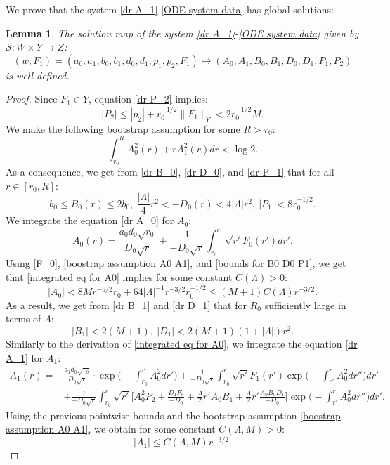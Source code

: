 \documentclass[11pt]{article}
\newtheorem{lemma}{Lemma}[section]
\numberwithin{equation}{section}
\begin{document}
We prove that the system \eqref{dr A_1}-\eqref{ODE system data} has global solutions:
\begin{lemma}\label{S is well defined lemma}
        The solution map of the system \eqref{dr A_1}-\eqref{ODE system data} given by $\mathcal{S}:W\times Y\rightarrow Z$: \[(w,F_1)=(a_0,a_1,b_0,b_1,d_0,d_1,p_1,p_2,F_1)\mapsto(A_0,A_1,B_0,B_1,D_0,D_1,P_1,P_2)\] is well-defined.
\end{lemma}
    \begin{proof}
        Since $F_1\in Y$, equation \eqref{dr P_2} implies:
        \[|P_2|\leq|p_2|+r_0^{-1/2}\|F_1\|_Y<2r_0^{-1/2}M.\]
        We make the following bootstrap assumption for some $R>r_0$:
        \begin{equation}\label{boostrap assumption A0 A1}
            \int_{r_0}^RA_0^2(r)+rA_1^2(r)dr<\log2.
        \end{equation}
        As a consequence, we get from \eqref{dr B_0}, \eqref{dr D_0}, and \eqref{dr P_1} that for all $r\in[r_0,R]$:
        \begin{equation}\label{bounds for B0 D0 P1}
            b_0\leq B_0(r)\leq 2b_0,\ \frac{|\Lambda|}{4}r^2<-D_0(r)<4|\Lambda|r^2,\ |P_1|<8r_0^{-1/2}.
        \end{equation}
        We integrate the equation \eqref{dr A_0} for $A_0:$
        \begin{equation}\label{integrated eq for A0}
            A_0(r)=\frac{a_0d_0\sqrt{r_0}}{D_0\sqrt{r}}+\frac{1}{-D_0\sqrt{r}}\int_{r_0}^r\sqrt{r'}F_0(r')dr'.
        \end{equation}
        Using \eqref{F_0}, \eqref{boostrap assumption A0 A1}, and \eqref{bounds for B0 D0 P1}, we get that \eqref{integrated eq for A0} implies for some constant $C(\Lambda)>0$:
        \begin{equation}\label{pointwise bound for A0}
            |A_0|<8Mr^{-5/2}r_0+64|\Lambda|^{-1}r^{-3/2}r_0^{-1/2}\leq (M+1)C(\Lambda)r^{-3/2}.
        \end{equation}
        As a result, we get from \eqref{dr B_1} and \eqref{dr D_1} that for $R_0$ sufficiently large in terms of $\Lambda$:
        \[|B_1|<2(M+1),\ |D_1|<2(M+1)(1+|\Lambda|)r^2.\]
        Similarly to the derivation of \eqref{integrated eq for A0}, we integrate the equation \eqref{dr A_1} for $A_1:$
        \begin{align*}
            A_1(r)=&\frac{a_1d_0\sqrt{r_0}}{D_0\sqrt{r}}\cdot\exp\bigg(-\int_{r_0}^rA_0^2dr'\bigg)+\frac{1}{-D_0\sqrt{r}}\int_{r_0}^r\sqrt{r'}F_1(r')\exp\bigg(-\int_{r'}^rA_0^2dr''\bigg)dr'\\
            &+\frac{1}{-D_0\sqrt{r}}\int_{r_0}^r\sqrt{r'}\bigg[A_0^2P_2+\frac{D_1F_0}{-D_0}+\frac{\Lambda}{2}r'A_0B_1+\frac{\Lambda}{2}r'\frac{A_0B_0D_1}{-D_0}\bigg]\exp\bigg(-\int_{r'}^rA_0^2dr''\bigg)dr'.
        \end{align*}
        Using the previous pointwise bounds and the bootstrap assumption \eqref{boostrap assumption A0 A1}, we obtain for some constant $C(\Lambda,M)>0$:
        \begin{equation}\label{pointwise bound for A1}
            |A_1|\leq C(\Lambda,M)r^{-3/2}.
        \end{equation}
        

\end{proof}
\end{document}
